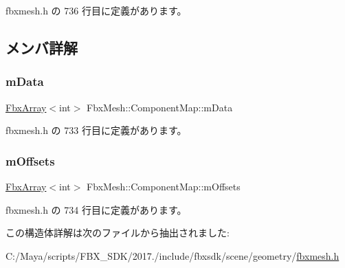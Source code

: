  fbxmesh.\+h の 736 行目に定義があります。



\subsection{メンバ詳解}
\mbox{\label{struct_fbx_mesh_1_1_component_map_a8ee6102745a5ff75b15584d1fba94c52}} 
\subsubsection{\texorpdfstring{m\+Data}{mData}}
{\footnotesize\ttfamily \hyperlink{class_fbx_array}{Fbx\+Array}$<$int$>$ Fbx\+Mesh\+::\+Component\+Map\+::m\+Data}



 fbxmesh.\+h の 733 行目に定義があります。

\mbox{\label{struct_fbx_mesh_1_1_component_map_a1228c1a961435c616f98d14a7d853414}} 
\subsubsection{\texorpdfstring{m\+Offsets}{mOffsets}}
{\footnotesize\ttfamily \hyperlink{class_fbx_array}{Fbx\+Array}$<$int$>$ Fbx\+Mesh\+::\+Component\+Map\+::m\+Offsets}



 fbxmesh.\+h の 734 行目に定義があります。



この構造体詳解は次のファイルから抽出されました\+:\begin{DoxyCompactItemize}
\item 
C\+:/\+Maya/scripts/\+F\+B\+X\+\_\+\+S\+D\+K/2017./include/fbxsdk/scene/geometry/\hyperlink{fbxmesh_8h}{fbxmesh.\+h}\end{DoxyCompactItemize}
